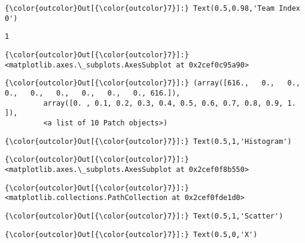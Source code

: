 \documentclass[11pt]{article}
\begin{document}
\begin{Verbatim}[commandchars=\\\{\}]
{\color{outcolor}Out[{\color{outcolor}7}]:} Text(0.5,0.98,'Team Index 0')
\end{Verbatim}
            
    \begin{Verbatim}[commandchars=\\\{\}]
1

    \end{Verbatim}

\begin{Verbatim}[commandchars=\\\{\}]
{\color{outcolor}Out[{\color{outcolor}7}]:} <matplotlib.axes.\_subplots.AxesSubplot at 0x2cef0c95a90>
\end{Verbatim}
            
\begin{Verbatim}[commandchars=\\\{\}]
{\color{outcolor}Out[{\color{outcolor}7}]:} (array([616.,   0.,   0.,   0.,   0.,   0.,   0.,   0.,   0., 616.]),
         array([0. , 0.1, 0.2, 0.3, 0.4, 0.5, 0.6, 0.7, 0.8, 0.9, 1. ]),
         <a list of 10 Patch objects>)
\end{Verbatim}
            
\begin{Verbatim}[commandchars=\\\{\}]
{\color{outcolor}Out[{\color{outcolor}7}]:} Text(0.5,1,'Histogram')
\end{Verbatim}
            
\begin{Verbatim}[commandchars=\\\{\}]
{\color{outcolor}Out[{\color{outcolor}7}]:} <matplotlib.axes.\_subplots.AxesSubplot at 0x2cef0f8b550>
\end{Verbatim}
            
\begin{Verbatim}[commandchars=\\\{\}]
{\color{outcolor}Out[{\color{outcolor}7}]:} <matplotlib.collections.PathCollection at 0x2cef0fde1d0>
\end{Verbatim}
            
\begin{Verbatim}[commandchars=\\\{\}]
{\color{outcolor}Out[{\color{outcolor}7}]:} Text(0.5,1,'Scatter')
\end{Verbatim}
            
\begin{Verbatim}[commandchars=\\\{\}]
{\color{outcolor}Out[{\color{outcolor}7}]:} Text(0.5,0,'X')
\end{Verbatim}
            
\end{document}
